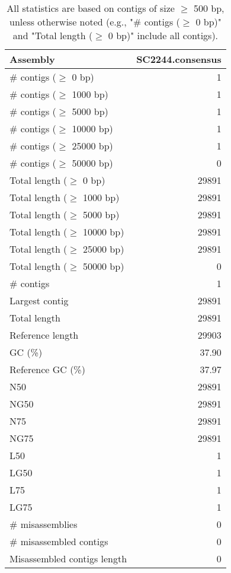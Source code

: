 \documentclass[12pt,a4paper]{article}
\begin{document}
\begin{table}[ht]
\begin{center}
\caption{All statistics are based on contigs of size $\geq$ 500 bp, unless otherwise noted (e.g., "\# contigs ($\geq$ 0 bp)" and "Total length ($\geq$ 0 bp)" include all contigs).}
\begin{tabular}{|l*{1}{|r}|}
\hline
Assembly & SC2244.consensus \\ \hline
\# contigs ($\geq$ 0 bp) & 1 \\ \hline
\# contigs ($\geq$ 1000 bp) & 1 \\ \hline
\# contigs ($\geq$ 5000 bp) & 1 \\ \hline
\# contigs ($\geq$ 10000 bp) & 1 \\ \hline
\# contigs ($\geq$ 25000 bp) & 1 \\ \hline
\# contigs ($\geq$ 50000 bp) & 0 \\ \hline
Total length ($\geq$ 0 bp) & 29891 \\ \hline
Total length ($\geq$ 1000 bp) & 29891 \\ \hline
Total length ($\geq$ 5000 bp) & 29891 \\ \hline
Total length ($\geq$ 10000 bp) & 29891 \\ \hline
Total length ($\geq$ 25000 bp) & 29891 \\ \hline
Total length ($\geq$ 50000 bp) & 0 \\ \hline
\# contigs & 1 \\ \hline
Largest contig & 29891 \\ \hline
Total length & 29891 \\ \hline
Reference length & 29903 \\ \hline
GC (\%) & 37.90 \\ \hline
Reference GC (\%) & 37.97 \\ \hline
N50 & 29891 \\ \hline
NG50 & 29891 \\ \hline
N75 & 29891 \\ \hline
NG75 & 29891 \\ \hline
L50 & 1 \\ \hline
LG50 & 1 \\ \hline
L75 & 1 \\ \hline
LG75 & 1 \\ \hline
\# misassemblies & 0 \\ \hline
\# misassembled contigs & 0 \\ \hline
Misassembled contigs length & 0 \\ \hline

\end{tabular}
\end{center}
\end{table}
\end{document}
